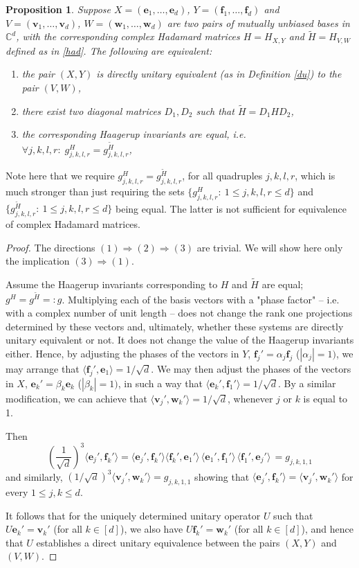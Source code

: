 \documentclass[12pt]{amsart}
\numberwithin{equation}{section}
\newtheorem{proposition}[fact]{Proposition}
\theoremstyle{definition}
\theoremstyle{remark}
\theoremstyle{remark}
\newcommand{\CC}{\ensuremath{\mathbb{C}}}
\newcommand{\vb}{\ensuremath{\mathbf{v}}}
\newcommand{\eb}{\ensuremath{\mathbf{e}}}
\newcommand{\fb}{\ensuremath{\mathbf{f}}}
\newcommand{\wb}{\ensuremath{\mathbf{w}}}
\begin{document}
\begin{proposition}\label{pairdu}
Suppose $X=(\eb_1,\ldots,\eb_d)$, $Y=(\fb_1,\ldots,\fb_d)$ and $V=(\vb_1,\ldots,\vb_d)$, $W=(\wb_1,\ldots,\wb_d)$ are two pairs of mutually unbiased bases in $\CC^d$, with the corresponding  complex Hadamard matrices $H=H_{X,Y}$ and $\tilde{H}=H_{V,W}$ defined as in \eqref{had}. The following are equivalent: 
\begin{enumerate}
    \item the pair $(X, Y)$ is directly unitary equivalent (as in Definition \ref{du}) to the pair $(V, W)$,
    \item there exist two diagonal matrices $D_1,D_2$ such that $\tilde{H}=D_1 H D_2$,
    \item the corresponding Haagerup invariants are equal, i.e. $\forall j,k,l,r:\; g^H_{j,k,l,r}=g^{\tilde{H}}_{j,k,l,r}$,
    \end{enumerate}
\end{proposition}

Note here that we require $g^H_{j,k,l,r}=g^{\tilde{H}}_{j,k,l,r}$, for all quadruples  $j,k,l,r$, which is much stronger than just requiring the sets $\{ g^H_{j,k,l,r}: \ 1\le j,k,l,r \le d\}$ and $\{ g^{\tilde{H}}_{j,k,l,r}: \ 1\le j,k,l,r \le d\}$ being equal. The latter is not sufficient for equivalence of complex Hadamard matrices. 

\begin{proof}
The directions $(1)\Rightarrow(2)\Rightarrow (3)$ are trivial. We will show here only the implication $(3)\Rightarrow (1)$. 

Assume the Haagerup invariants corresponding to $H$ and $\tilde{H}$ are equal; $g^H=g^{\tilde{H}}=:g$. Multiplying each of the basis vectors with a "phase factor" -- i.e. with a complex number of unit length -- does not change the rank one projections determined by these vectors and, ultimately, whether these systems are directly unitary equivalent or not. It does not change the value of the Haagerup invariants either. Hence, by adjusting the phases of the vectors in $Y$, $\fb_j'=\alpha_j\fb_j$ ($|\alpha_j|=1)$,  we may arrange that  $\langle \fb_j', \eb_1\rangle =1/\sqrt{d}$. We may then adjust the phases of the vectors in $X$,  $\eb_k'=\beta_k\eb_k$ ($|\beta_k|=1)$, in such a way that $\langle \eb_k', \fb_1' \rangle=1/\sqrt{d}$. By a similar modification, we can achieve that $\langle \vb_j',\wb_k' \rangle = 1/\sqrt{d}$, whenever $j$ or $k$ is equal to 1. 

Then
$$
\left(\frac{1}{\sqrt{d}}\right)^3\langle\eb_j',\fb_k'\rangle =
\langle\eb_j',\fb_k'\rangle
\langle\fb_k',\eb_1'\rangle\, 
\langle\eb_1',\fb_1'\rangle\, 
\langle\fb_1',\eb_j' \rangle\, 
=
g_{j,k,1,1}
$$
and similarly, $(1/\sqrt{d})^3 \langle\vb_j',\wb_k'\rangle =g_{j,k,1,1}$ showing that $\langle\eb_j',\fb_k'\rangle =\langle\vb_j',\wb_k'\rangle$ for every $1\le j, k\le d$. 

It follows that for the uniquely determined unitary operator $U$ such that $U\eb_k' =\vb_k'$ (for all $k\in [d]$), we also have $U\fb_k' =\wb_k'$ (for all $k\in [d]$), and hence that $U$ establishes a direct unitary equivalence between the pairs $(X,Y)$ and $(V,W)$. 
\end{proof}
\end{document}
